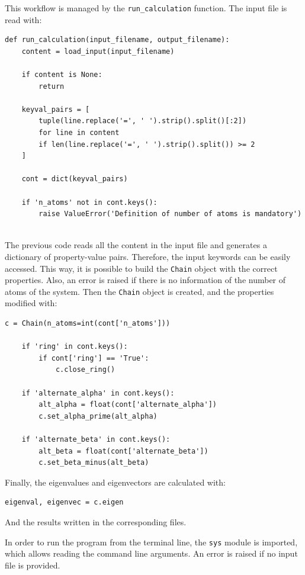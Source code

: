 \documentclass{article}
\begin{document}
This workflow is managed by the \texttt{run\_calculation} function. The input file is read with:

\begin{lstlisting}[backgroundcolor=\color{LightGray}]
def run_calculation(input_filename, output_filename):
    content = load_input(input_filename)

    if content is None:
        return

    keyval_pairs = [ 
        tuple(line.replace('=', ' ').strip().split()[:2])
        for line in content 
        if len(line.replace('=', ' ').strip().split()) >= 2
    ]

    cont = dict(keyval_pairs)

    if 'n_atoms' not in cont.keys():
        raise ValueError('Definition of number of atoms is mandatory')
    
\end{lstlisting} 

The previous code reads all the content in the input file and generates a dictionary of property-value pairs. Therefore, the input keywords can be easily accessed. This way, it is possible to build the \texttt{Chain} object with the correct properties. Also, an error is raised if there is no information of the number of atoms of the system. Then the \texttt{Chain} object is created, and the properties modified with:

\begin{lstlisting}[backgroundcolor=\color{LightGray}]
    c = Chain(n_atoms=int(cont['n_atoms']))

    if 'ring' in cont.keys():
        if cont['ring'] == 'True':
            c.close_ring()

    if 'alternate_alpha' in cont.keys():
        alt_alpha = float(cont['alternate_alpha'])
        c.set_alpha_prime(alt_alpha)

    if 'alternate_beta' in cont.keys():
        alt_beta = float(cont['alternate_beta'])
        c.set_beta_minus(alt_beta)
\end{lstlisting} 

Finally, the eigenvalues and eigenvectors are calculated with:
\begin{lstlisting}[backgroundcolor=\color{LightGray}]
        eigenval, eigenvec = c.eigen    
\end{lstlisting} 

And the results written in the corresponding files.

In order to run the program from the terminal line, the \texttt{sys} module is imported, which allows reading the command line arguments. An error is raised if no input file is provided. 
\end{document}
